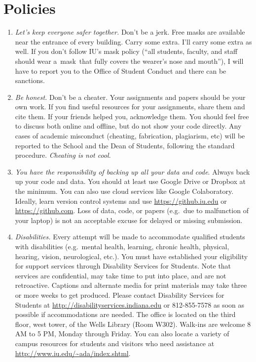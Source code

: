 \documentclass[11pt,article,oneside]{memoir} %
\begin{document}
\section{Policies}%
\begin{enumerate}%
    \setlength\itemsep{1em}
\item \emph{Let's keep everyone safer together.} Don't be a jerk. Free masks are available near the entrance of every building. Carry some extra. I'll carry some extra as well. If you don't follow IU's mask policy (``all students, faculty, and staff should wear a mask that fully covers the wearer’s nose and mouth''), I will have to report you to the Office of Student Conduct and there can be sanctions. 

\item \emph{Be honest.} Don't be a cheater. Your assignments and papers should be your own work.  
If you find useful resources for your assignments, share them and cite them. 
If your friends helped you, acknowledge them. 
You should feel free to discuss both online and offline, but do not show your code directly.  
Any cases of academic misconduct (cheating, fabrication, plagiarism, etc) will be reported to the School and the Dean of Students, following the standard procedure. 
\emph{Cheating is not cool}. 

\item \emph{You have the responsibility of backing up all your data and code}.
Always back up your code and data. You should at least use Google Drive or Dropbox at the minimum.
You can also use cloud services like Google Colaboratory.
Ideally, learn version control systems and use \url{https://github.iu.edu} or \url{https://github.com}. 
Loss of data, code, or papers (e.g.~due to malfunction of your laptop) is not an acceptable excuse for delayed or missing submission. 

\item \emph{Disabilities.} Every attempt will be made to accommodate qualified
students with disabilities (e.g.~mental health, learning, chronic health,
physical, hearing, vision, neurological, etc.). You must have established your
eligibility for support services through Disability Services for Students. Note
that services are confidential, may take time to put into place, and are not
retroactive.  Captions and alternate media for print materials may take three
or more weeks to get produced. Please contact Disability Services for Students
at \url{http://disabilityservices.indiana.edu} or 812-855-7578 as soon as
possible if accommodations are needed. The office is located on the third
floor, west tower, of the Wells Library (Room W302). Walk-ins are welcome 8 AM
to 5 PM, Monday through Friday. You can also locate a variety of campus
resources for students and visitors who need assistance at
\url{http://www.iu.edu/~ada/index.shtml}. 


\end{enumerate}
\end{document}
